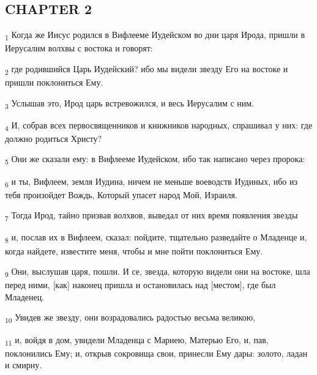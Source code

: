 \subsection{CHAPTER 2}
\begin{tcolorbox}
\textsubscript{1} Когда же Иисус родился в Вифлееме Иудейском во дни царя Ирода, пришли в Иерусалим волхвы с востока и говорят:
\end{tcolorbox}
\begin{tcolorbox}
\textsubscript{2} где родившийся Царь Иудейский? ибо мы видели звезду Его на востоке и пришли поклониться Ему.
\end{tcolorbox}
\begin{tcolorbox}
\textsubscript{3} Услышав это, Ирод царь встревожился, и весь Иерусалим с ним.
\end{tcolorbox}
\begin{tcolorbox}
\textsubscript{4} И, собрав всех первосвященников и книжников народных, спрашивал у них: где должно родиться Христу?
\end{tcolorbox}
\begin{tcolorbox}
\textsubscript{5} Они же сказали ему: в Вифлееме Иудейском, ибо так написано через пророка:
\end{tcolorbox}
\begin{tcolorbox}
\textsubscript{6} и ты, Вифлеем, земля Иудина, ничем не меньше воеводств Иудиных, ибо из тебя произойдет Вождь, Который упасет народ Мой, Израиля.
\end{tcolorbox}
\begin{tcolorbox}
\textsubscript{7} Тогда Ирод, тайно призвав волхвов, выведал от них время появления звезды
\end{tcolorbox}
\begin{tcolorbox}
\textsubscript{8} и, послав их в Вифлеем, сказал: пойдите, тщательно разведайте о Младенце и, когда найдете, известите меня, чтобы и мне пойти поклониться Ему.
\end{tcolorbox}
\begin{tcolorbox}
\textsubscript{9} Они, выслушав царя, пошли. И се, звезда, которую видели они на востоке, шла перед ними, [как] наконец пришла и остановилась над [местом], где был Младенец.
\end{tcolorbox}
\begin{tcolorbox}
\textsubscript{10} Увидев же звезду, они возрадовались радостью весьма великою,
\end{tcolorbox}
\begin{tcolorbox}
\textsubscript{11} и, войдя в дом, увидели Младенца с Мариею, Матерью Его, и, пав, поклонились Ему; и, открыв сокровища свои, принесли Ему дары: золото, ладан и смирну.
\end{tcolorbox}
